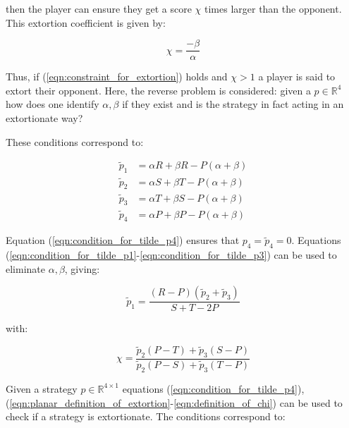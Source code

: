 \documentclass[a4paper]{article}
\begin{document}
then the player can ensure they get a score \(\chi\) times
larger than the opponent. This extortion coefficient is given by:

\begin{equation}\label{eqn:definition_of_chi}
    \chi=\frac{-\beta}{\alpha}
\end{equation}

Thus, if (\ref{eqn:constraint_for_extortion}) holds and \(\chi >1\) a player is
said to extort their opponent.
Here, the reverse problem is considered: given a
\(p\in\mathbb{R}^4\) how does one identify \(\alpha, \beta\) if they
exist and is the strategy in fact acting in an extortionate way?

These conditions correspond to:

\begin{align}
    \tilde p_1 & = \alpha R + \beta R - P (\alpha + \beta)
            \label{eqn:condition_for_tilde_p1}\\
    \tilde p_2 & = \alpha S + \beta T - P (\alpha + \beta)
            \label{eqn:condition_for_tilde_p2}\\
    \tilde p_3 & = \alpha T + \beta S - P (\alpha + \beta)
            \label{eqn:condition_for_tilde_p3}\\
    \tilde p_4 & = \alpha P + \beta P - P (\alpha + \beta)
            \label{eqn:condition_for_tilde_p4}
\end{align}

Equation (\ref{eqn:condition_for_tilde_p4}) ensures that \(p_4=\tilde p_4=0\).
Equations (\ref{eqn:condition_for_tilde_p1}-\ref{eqn:condition_for_tilde_p3})
can be used to eliminate \(\alpha, \beta\), giving:

\begin{equation}\label{eqn:planar_definition_of_extortion}
    \tilde p_1 = \frac{(R - P)(\tilde p_2 + \tilde p_3)}{S + T - 2P}
\end{equation}

with:

\begin{equation}\label{eqn:definition_of_chi}
    \chi = \frac{\tilde p_2 (P - T) + \tilde p_3 (S - P)}
                {\tilde p_2 (P - S) + \tilde p_3 (T - P)}
\end{equation}

Given a strategy \(p\in\mathbb{R}^{4\times 1}\) equations
(\ref{eqn:condition_for_tilde_p4}), (\ref{eqn:planar_definition_of_extortion}-\ref{eqn:definition_of_chi}) can be used to check if
a strategy is extortionate. The conditions correspond to:
\end{document}
